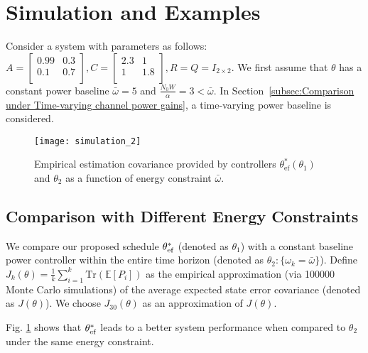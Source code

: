 \documentclass[twocolumn]{autart}    \usepackage{cite}
\begin{document}
{\section{Simulation and Examples}
\label{sec:simulation}
{
Consider a system with parameters as follows:
$
A=\left[
      \begin{array}{cc}
        0.99 & 0.3 \\
        0.1 & 0.7\\
      \end{array}
    \right],
C=\left[
      \begin{array}{cc}
        2.3 & 1 \\
        1 & 1.8\\
      \end{array}
    \right],
R=Q=I_{2\times 2}.
$
}
{We first assume that $\theta$
has a constant power baseline
$\bar\omega=5$ and $\frac{N_0W}{\alpha}=3<\bar\omega.$
In Section~\ref{subsec:Comparison under Time-varying channel power gains},
a time-varying power baseline is considered.}




\begin{figure}[thp]
  \centering
  \texttt{[image: simulation\_2]}
  \caption{Empirical estimation covariance provided by  controllers $\theta^*_{\text{ef}}(\theta_1)$ and $\theta_2$ as a function of energy constraint $\bar\omega$.} \label{fig:simulation_2}
  \vspace{-1mm}
\end{figure}

\subsection{Comparison with Different Energy Constraints}
We compare our proposed schedule
$\theta_{\rm ef}^*$ (denoted as $\theta_1$)
with a constant baseline power controller
within the entire time horizon (denoted as $\theta_2: \{\omega_k=\bar\omega\}$).
Define
$
  J_k(\theta)=\frac{1}{k}\sum_{i=1}^{k}\mathrm{Tr} \left(\mathbb{E}[P_i]\right)
$
as the empirical approximation (via 100000 Monte Carlo simulations) of the average expected state error covariance (denoted as $J(\theta)$). We choose $J_{30}(\theta)$ as an approximation of $J(\theta)$.

Fig. \ref{fig:simulation_2} shows that $\theta_{\rm ef}^*$ leads to a better system performance when compared to $\theta_2$ under the same energy constraint.

}
\end{document}

